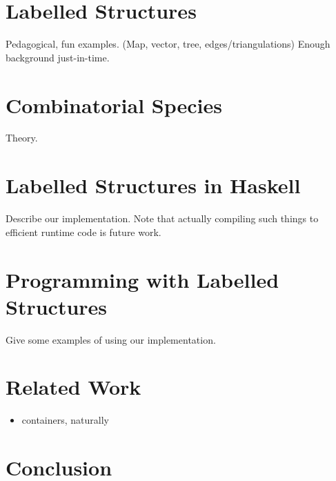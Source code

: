 \documentclass[9pt,preprint]{sigplanconf}
\begin{document}
\section{Labelled Structures}
\label{sec:labelled}

\begin{todo}
  Pedagogical, fun examples. (Map, vector, tree, edges/triangulations)
  Enough background just-in-time.
\end{todo}

\section{Combinatorial Species}
\label{sec:species}

\begin{todo}
  Theory.
\end{todo}

\section{Labelled Structures in Haskell}
\label{sec:haskell}

\begin{todo}
  Describe our implementation.  Note that actually compiling such
  things to efficient runtime code is future work.
\end{todo}

\section{Programming with Labelled Structures}
\label{sec:programming}

\begin{todo}
  Give some examples of using our implementation.
\end{todo}

\section{Related Work}
\label{sec:related}

\begin{itemize}
\item containers, naturally
\end{itemize}

\section{Conclusion}
\label{sec:conclusion}


%
%
\end{document}
